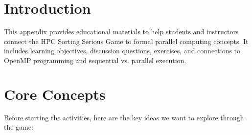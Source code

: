 

\section{Introduction}
\label{app:d:introduction}

This appendix provides educational materials to help students and instructors connect the HPC Sorting Serious Game to formal parallel computing concepts. It includes learning objectives, discussion questions, exercises, and connections to OpenMP programming and sequential vs. parallel execution.

\section{Core Concepts}
\label{app:d:core-concepts}

Before starting the activities, here are the key ideas we want to explore through the game:

